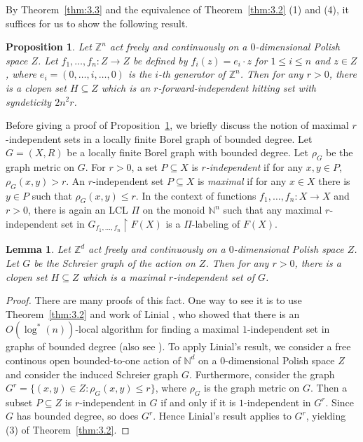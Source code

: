 \documentclass[11pt, reqno, a4paper]{amsart}
\newtheorem{lemma}[theorem]{Lemma}
\newtheorem{proposition}[theorem]{Proposition}
\theoremstyle{definition}
\theoremstyle{plain}
\begin{document}
By Theorem~\ref{thm:3.3} and the equivalence of Theorem~\ref{thm:3.2} (1) and (4), it suffices for us to show the following result.

\begin{proposition}\label{prop:3.4} Let $\mathbb{Z}^n$ act freely and continuously on a $0$-dimensional Polish space $Z$. Let $f_1, \dots, f_n\colon Z\to Z$ be defined by $f_i(z)=e_i\cdot z$ for $1\leq i\leq n$ and $z\in Z$, where $e_i=(0,\dots, i, \dots, 0)$ is the $i$-th generator of $\mathbb{Z}^n$. Then for any $r>0$, there is a clopen set $H\subseteq Z$ which is an $r$-forward-independent hitting set with syndeticity $2n^2r$.
\end{proposition}

Before giving a proof of Proposition~\ref{prop:3.4}, 
we briefly discuss the notion of maximal $r$-independent sets in a locally finite Borel graph of bounded degree. Let $G=(X, R)$ be a locally finite Borel graph with bounded degree.
Let $\rho_G$ be the graph metric on $G$. For $r>0$, a set $P\subseteq X$ is \emph{$r$-independent} if for any $x, y\in P$,
$\rho_G(x,y)>r$. An $r$-independent set $P\subseteq X$ is \emph{maximal} if for any $x\in X$ there is $y\in P$ such that $\rho_G(x,y)\leq r$. In the context of functions $f_1, \dots, f_n\colon X\to X$ and $r>0$, there is again an LCL $\Pi$ on the monoid $\mathbb{N}^n$ such that any maximal $r$-independent set in $G_{f_1,\dots, f_n}\upharpoonright F(X)$ is a $\Pi$-labeling of $F(X)$.

\begin{lemma}\label{lem:3.5} Let $\mathbb{Z}^d$ act freely and continuously on a $0$-dimensional Polish space $Z$. Let $G$ be the Schreier graph of the action on $Z$. Then for any $r>0$, there is a clopen set $H\subseteq Z$ which is a maximal $r$-independent set of $G$.
\end{lemma}

\begin{proof} There are many proofs of this fact. One way to see it is to use Theorem~\ref{thm:3.2} and work of Linial \cite{Lin92}, who showed that there is an $O(\log^*(n))$-local algorithm for finding a maximal $1$-independent set in graphs of bounded degree (also see \cite[Proposition 6.2]{NaryshkinShinkoWeilacherYuCommutingFunctions}). 
To apply Linial's result, we consider a free continous open bounded-to-one action of $\mathbb{N}^d$ on a $0$-dimensional Polish space $Z$ and consider the induced Schreier graph $G$. Furthermore, consider the graph $G^r=\{(x,y)\in Z\colon \rho_G(x,y)\leq r\}$, where $\rho_G$ is the graph metric on $G$. Then a subset $P\subseteq Z$ is $r$-independent in $G$ if and only if it is $1$-independent in $G^r$. Since $G$ has bounded degree, so does $G^r$. Hence Linial's result applies to $G^r$,   yielding (3) of Theorem~\ref{thm:3.2}.
\end{proof}
\end{document}
